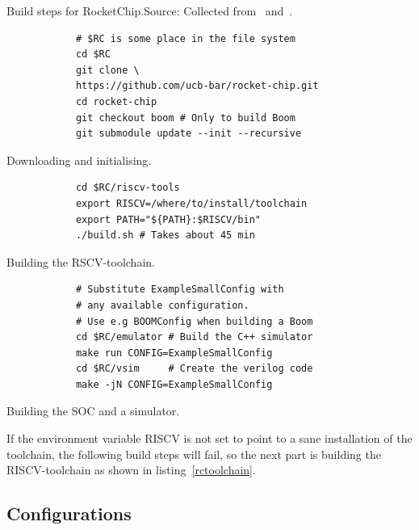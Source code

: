 \documentclass[journal,a4paper]{IEEEtran}
\begin{document}

\begin{table}
	\caption{Build steps for RocketChip.\newline\hspace{\linewidth}Source: Collected from~\cite{rc_github} and~\cite{boom_github}.}
	\begin{subtable}[b]{0.9\linewidth}
		\begin{verbatim}
			# $RC is some place in the file system
			cd $RC
			git clone \
			https://github.com/ucb-bar/rocket-chip.git
			cd rocket-chip
			git checkout boom # Only to build Boom
			git submodule update --init --recursive
		\end{verbatim}
		\caption{Downloading and initialising.}
		\label{rcclone}
	\end{subtable}
	\begin{subtable}[b]{0.9\linewidth}
		\begin{verbatim}
			cd $RC/riscv-tools
			export RISCV=/where/to/install/toolchain
			export PATH="${PATH}:$RISCV/bin"
			./build.sh # Takes about 45 min
		\end{verbatim}
		\caption{Building the RSCV-toolchain.}
		\label{rctoolchain}
	\end{subtable}
	\begin{subtable}[b]{0.9\linewidth}
		\begin{verbatim}
			# Substitute ExampleSmallConfig with
			# any available configuration.
			# Use e.g BOOMConfig when building a Boom
			cd $RC/emulator # Build the C++ simulator
			make run CONFIG=ExampleSmallConfig
			cd $RC/vsim     # Create the verilog code
			make -jN CONFIG=ExampleSmallConfig
		\end{verbatim}
		\caption{Building the SOC and a simulator.}
		\label{rcmake}
	\end{subtable}
\end{table}

If the environment variable RISCV is not set to point to a sane installation of the toolchain, the following build steps will fail, so the next part is building the RISCV-toolchain as shown in listing~\ref{rctoolchain}.

\subsection{Configurations}
\end{document}
